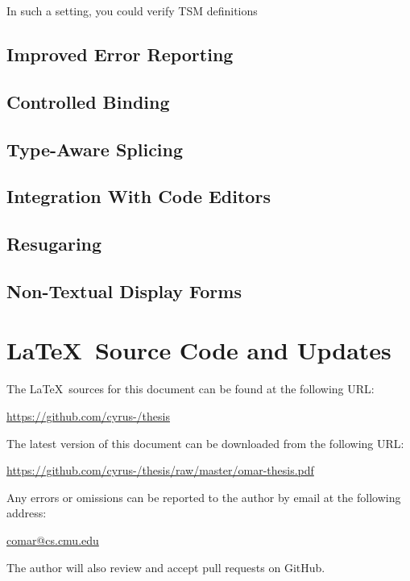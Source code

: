 In such a setting, you could verify TSM definitions 
\subsection{Improved Error Reporting}\label{sec:error-handling}
\subsection{Controlled Binding}\label{sec:controlled-binding}
\subsection{Type-Aware Splicing}\label{sec:type-aware-splicing}
\subsection{Integration With Code Editors}\label{sec:interaction-with-tools}
\subsection{Resugaring}\label{sec:resugaring}
\subsection{Non-Textual Display Forms}\label{sec:non-textual-display-forms}

\newpage
\section*{\LaTeX~Source Code and Updates}
\noindent
The \LaTeX~sources for this document can be found at the following URL:
\begin{center}
\url{https://github.com/cyrus-/thesis}
\end{center}
The latest version of this document can be downloaded from the following URL:
\begin{center}
\url{https://github.com/cyrus-/thesis/raw/master/omar-thesis.pdf}
\end{center}
Any errors or omissions can be reported to the author by email at the following address:
\begin{center}
\url{comar@cs.cmu.edu}
\end{center}
The author will also review and accept pull requests on GitHub.